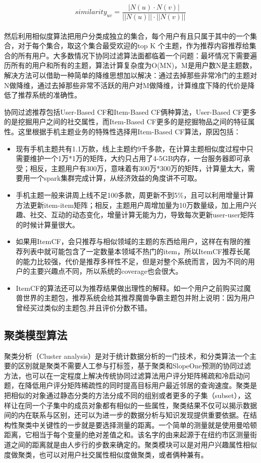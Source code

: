 		\begin{equation}
			similarity_{uv} = \frac{|N(u)\cdot N(v)|}{||N(u)||\cdot||N(v)||}
			\label{cosine-similiarity}
		\end{equation}
		\\然后利用相似度算法把用户分类成独立的集合，每个用户有且只属于其中的一个集合，对于每个集合，取这个集合最受欢迎的top K 个主题，作为推荐内容推荐给集合的所有用户。大多数情况下协同过滤算法面都临着一个问题：最坏情况下需要遍历所有的用户和所有的主题，算法计算复杂度为O(MN)，M是用户数N是主题数，解决方法可以借助一种简单的降维思想加以解决：通过去掉那些非常冷门的主题对N做降维，通过去掉那些非常不活跃的用户对M做降维，计算维度下降的代价是降低了推荐系统的准确性。

		协同过滤推荐包括User-Based CF和Item-Based CF俩种算法，User-Based CF更多的是挖掘用户之间的社交属性，而Item-Based CF更多的是挖掘物品之间的特征属性。这里根据手机主题业务的特殊性选择用Item-Based CF算法，原因包括：
		\begin{itemize}
		\item 现有手机主题共有1.1万款，线上主题约9千多款，在计算主题相似度过程中只需要维护一个1万*1万的矩阵，大约只占用了4-5GB内存，一台服务器即可承受；相反，主题用户有300万，意味着有300万*300万的矩阵，计算量太大，需要用一个spark集群完成计算，从经济效益的角度讲不可取。
		\item 手机主题一般来讲周上线不足100多款，周更新不到5\%，且可以利用增量计算方法更新item-item矩阵；相反，主题用户周增加量为10万数量级，加上用户兴趣、社交、互动的动态变化，增量计算无能为力，导致每次更新user-user矩阵的时候计算量很大。
		\item 如果用ItemCF，会只推荐与相似领域的主题的东西给用户，这样在有限的推荐列表中就可能包含了一定数量本领域不热门的item，所以ItemCF推荐长尾的能力比较强，代价是推荐多样性不足，但是对整个系统而言，因为不同的用户的主要兴趣点不同，所以系统的coverage也会很大。
		\item ItemCF的算法还可以为推荐结果做出理性的解释。如一个用户之前购买过魔兽世界的主题包，推荐系统会给其推荐魔兽争霸主题包并附上说明：因为用户曾经买过类似的主题包,并且评价分数不错。
		\end{itemize}

		\subsection{聚类模型算法}
		聚类分析（Cluster analysis）是对于统计数据分析的一门技术，和分类算法一个主要的区别就是聚类不需要人工参与打标签，基于聚类和SlopeOne预测的协同过滤方法，也可以在一定程度上解决传统协同过滤算法用户评分矩阵稀疏和冷启动问题，在降低用户评分矩阵稀疏性的同时提高目标用户最近邻居的查询速度。聚类是把相似的对象通过静态分类的方法分成不同的组别或者更多的子集（subset），这样让在同一个子集中的成员对象都有相似的一些属性，聚类结果不仅可以揭示数据间的内在联系与区别，还可以为进一步的数据分析与知识发现提供重要依据。在结构性聚类中关键性的一步就是要选择测量的距离。一个简单的测量就是使用曼哈顿距离，它相当于每个变量的绝对差值之和。该名字的由来起源于在纽约市区测量街道之间的距离就是由人步行的步数来确定的。聚类模块可以是对用户兴趣属性相似度做聚类，也可以对用户社交属性相似度做聚类，或者俩种兼有。

